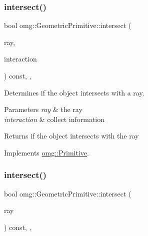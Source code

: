 \subsubsection{\texorpdfstring{intersect()}{intersect()}\hspace{0.1cm}{\footnotesize\ttfamily [1/2]}}
{\footnotesize\ttfamily bool omg\+::\+Geometric\+Primitive\+::intersect (\begin{DoxyParamCaption}\item[{const \mbox{\hyperlink{classomg_1_1_ray}{Ray}} \&}]{ray,  }\item[{\mbox{\hyperlink{classomg_1_1_surface_interaction}{Surface\+Interaction}} $\ast$}]{interaction }\end{DoxyParamCaption}) const\hspace{0.3cm}{\ttfamily [inline]}, {\ttfamily [override]}, {\ttfamily [virtual]}}



Determines if the object intersects with a ray. 


\begin{DoxyParams}{Parameters}
{\em ray} & the ray \\
\hline
{\em interaction} & collect information \\
\hline
\end{DoxyParams}
\begin{DoxyReturn}{Returns}
if the object intersects with the ray 
\end{DoxyReturn}


Implements \mbox{\hyperlink{classomg_1_1_primitive_a51f78d3f52794ae02e18688dff75414c}{omg\+::\+Primitive}}.

\mbox{\label{classomg_1_1_geometric_primitive_a797a2eb74fb48a7e25c7f98f16c604a7}} 
\subsubsection{\texorpdfstring{intersect()}{intersect()}\hspace{0.1cm}{\footnotesize\ttfamily [2/2]}}
{\footnotesize\ttfamily bool omg\+::\+Geometric\+Primitive\+::intersect (\begin{DoxyParamCaption}\item[{const \mbox{\hyperlink{classomg_1_1_ray}{Ray}} \&}]{ray }\end{DoxyParamCaption}) const\hspace{0.3cm}{\ttfamily [inline]}, {\ttfamily [override]}, {\ttfamily [virtual]}}



